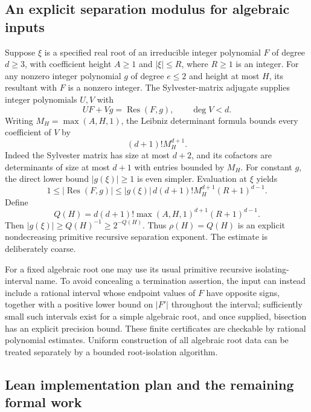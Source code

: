 \subsection{An explicit separation modulus for algebraic inputs}

Suppose $\xi$ is a specified real root of an irreducible integer
polynomial $F$ of degree $d\geq3$, with coefficient height $A\geq1$ and
$|\xi|\leq R$, where $R\geq1$ is an integer.  For any nonzero integer
polynomial $g$ of degree $e\leq2$ and height at most $H$, its resultant
with $F$ is a nonzero integer.  The Sylvester-matrix adjugate supplies
integer polynomials $U,V$ with
\[
 UF+Vg=\operatorname{Res}(F,g),\qquad \deg V<d.
\]
Writing $M_H=\max(A,H,1)$, the Leibniz determinant formula bounds every
coefficient of $V$ by
\[
 (d+1)!M_H^{d+1}.
\]
Indeed the Sylvester matrix has size at most $d+2$, and its cofactors
are determinants of size at most $d+1$ with entries bounded by $M_H$.
For constant $g$, the direct lower bound $|g(\xi)|\geq1$ is even simpler.
Evaluation at $\xi$ yields
\[
 1\leq|\operatorname{Res}(F,g)|
 \leq|g(\xi)|\,d(d+1)!M_H^{d+1}(R+1)^{d-1}.
\]
Define
\[
 Q(H)=d(d+1)!\max(A,H,1)^{d+1}(R+1)^{d-1}.
\]
Then $|g(\xi)|\geq Q(H)^{-1}\geq2^{-Q(H)}$.
Thus $\rho(H)=Q(H)$ is an explicit nondecreasing primitive recursive
separation exponent.  The estimate is deliberately coarse.

For a fixed algebraic root one may use its usual primitive recursive
isolating-interval name.  To avoid concealing a termination assertion,
the input can instead include a rational interval whose endpoint
values of $F$ have opposite signs, together with a positive lower bound
on $|F'|$ throughout the interval; sufficiently small such intervals
exist for a simple algebraic root, and once supplied, bisection has an
explicit precision bound.  These finite certificates are checkable by
rational polynomial estimates.  Uniform construction of all algebraic
root data can be treated separately by a bounded root-isolation algorithm.

\subsection{Lean implementation plan and the remaining formal work}

